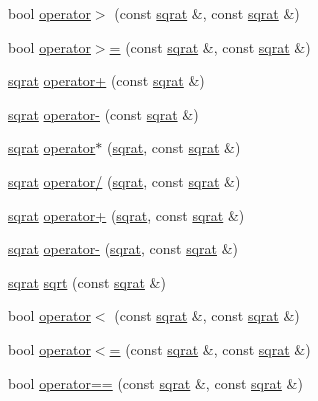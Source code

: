 \begin{DoxyCompactItemize}
\item 
bool \mbox{\hyperlink{classsqrat_a0a9ebc0afb8356e073d69a69d1450a65}{operator$>$}} (const \mbox{\hyperlink{classsqrat}{sqrat}} \&, const \mbox{\hyperlink{classsqrat}{sqrat}} \&)
\item 
bool \mbox{\hyperlink{classsqrat_adac0450048dc40c698aa22f334e280a1}{operator$>$=}} (const \mbox{\hyperlink{classsqrat}{sqrat}} \&, const \mbox{\hyperlink{classsqrat}{sqrat}} \&)
\item 
\mbox{\hyperlink{classsqrat}{sqrat}} \mbox{\hyperlink{classsqrat_a5a4ae2683cd1f23c81c09229d1dcc34a}{operator+}} (const \mbox{\hyperlink{classsqrat}{sqrat}} \&)
\item 
\mbox{\hyperlink{classsqrat}{sqrat}} \mbox{\hyperlink{classsqrat_ade89f3d4e5e8de405db9e23a1420d332}{operator-\/}} (const \mbox{\hyperlink{classsqrat}{sqrat}} \&)
\item 
\mbox{\hyperlink{classsqrat}{sqrat}} \mbox{\hyperlink{classsqrat_a0f75e7f8b43c76214b0845eadbfbfe6b}{operator$\ast$}} (\mbox{\hyperlink{classsqrat}{sqrat}}, const \mbox{\hyperlink{classsqrat}{sqrat}} \&)
\item 
\mbox{\hyperlink{classsqrat}{sqrat}} \mbox{\hyperlink{classsqrat_aa6e76248a9ec776743e60e5db8b3cb6d}{operator/}} (\mbox{\hyperlink{classsqrat}{sqrat}}, const \mbox{\hyperlink{classsqrat}{sqrat}} \&)
\item 
\mbox{\hyperlink{classsqrat}{sqrat}} \mbox{\hyperlink{classsqrat_a714592d215fdb454264df3d7bfbe0b5e}{operator+}} (\mbox{\hyperlink{classsqrat}{sqrat}}, const \mbox{\hyperlink{classsqrat}{sqrat}} \&)
\item 
\mbox{\hyperlink{classsqrat}{sqrat}} \mbox{\hyperlink{classsqrat_a78bb0ea9bd5a4282ba33a61c4bc073b6}{operator-\/}} (\mbox{\hyperlink{classsqrat}{sqrat}}, const \mbox{\hyperlink{classsqrat}{sqrat}} \&)
\item 
\mbox{\hyperlink{classsqrat}{sqrat}} \mbox{\hyperlink{classsqrat_aac93909598aa6f1b1b6bbe035a1af815}{sqrt}} (const \mbox{\hyperlink{classsqrat}{sqrat}} \&)
\item 
bool \mbox{\hyperlink{classsqrat_a1326bc7564a14f2fa4cbe59cdcf94b69}{operator$<$}} (const \mbox{\hyperlink{classsqrat}{sqrat}} \&, const \mbox{\hyperlink{classsqrat}{sqrat}} \&)
\item 
bool \mbox{\hyperlink{classsqrat_ae33aee8490a3137fb967fbd52b100f6d}{operator$<$=}} (const \mbox{\hyperlink{classsqrat}{sqrat}} \&, const \mbox{\hyperlink{classsqrat}{sqrat}} \&)
\item 
bool \mbox{\hyperlink{classsqrat_aa31a4a7298644b244db89e455265c946}{operator==}} (const \mbox{\hyperlink{classsqrat}{sqrat}} \&, const \mbox{\hyperlink{classsqrat}{sqrat}} \&)

\end{DoxyCompactItemize}
